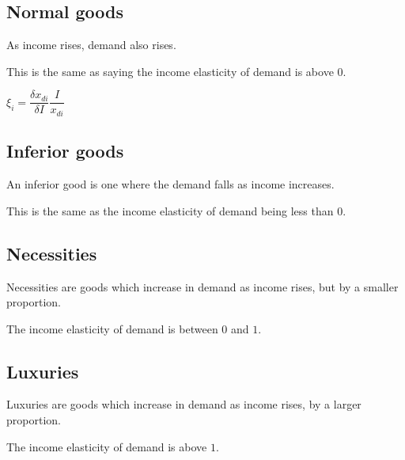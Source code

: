 
\subsection{Normal goods}

As income rises, demand also rises.

This is the same as saying the income elasticity of demand is above \(0\).

\(\xi_i =\dfrac{\delta x_{di}}{\delta I}\dfrac{I}{x_{di}}\)

\subsection{Inferior goods}

An inferior good is one where the demand falls as income increases.

This is the same as the income elasticity of demand being less than \(0\).

\subsection{Necessities}

Necessities are goods which increase in demand as income rises, but by a smaller proportion.

The income elasticity of demand is between \(0\) and \(1\).

\subsection{Luxuries}

Luxuries are goods which increase in demand as income rises, by a larger proportion.

The income elasticity of demand is above \(1\).

